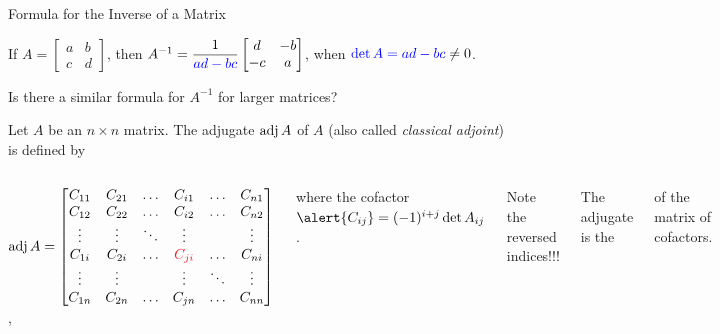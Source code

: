 \documentclass[xcolor=dvipsnames,aspectratio=169,t]{beamer}
\begin{document}
\begin{frame}{Formula for the Inverse of a Matrix}
  \medskip
  
  If $A = \begin{bmatrix} a & b \\ c & d \end{bmatrix}$, then
  $A^{-1} = \displaystyle\frac{1}{\textcolor{blue}{ad-bc}} \begin{bmatrix} d & -b \\ -c & a \end{bmatrix}$,
  when $\textcolor{blue}{\det A = ad-bc} \ne 0$.
  \bigskip
  
  \qquad Is there a similar formula for $A^{-1}$ for \alert{larger matrices}?
  \vspace*{2em}
  
  \pause
  Let $A$ be an $n\times n$ matrix.
  The \alert{adjugate $\mbox{adj}\, A$} of $A$ (also called \emph{classical adjoint}) is defined by
  \bigskip
  
  \begin{columns}
  
  $\adj A =
  \begin{bmatrix}
    C_{11} & C_{21} & \ldots & C_{i1} & \ldots & C_{n1} \\
    C_{12} & C_{22} & \ldots & C_{i2} & \ldots & C_{n2} \\
    \vdots & \vdots & \ddots & \vdots &        & \vdots \\
    C_{1i} & C_{2i} & \ldots & \red{C_{ji}} & \ldots & C_{ni} \\
    \vdots & \vdots &        & \vdots & \ddots & \vdots \\
    C_{1n} & C_{2n} & \ldots & C_{jn} & \ldots & C_{nn}
  \end{bmatrix}
  $,
  
  \bigskip
  
  where the \alert{cofactor} $\alert{C_{ij}}=(-1)^{i+j} \det A_{ij}$.
  \vspace*{1.5em}
  
  Note the \alert{reversed indices!!!}
  \medskip
  
  The adjugate is the  
  
  \quad of the matrix of cofactors.
  
  \end{columns}
\end{frame}
\end{document}
